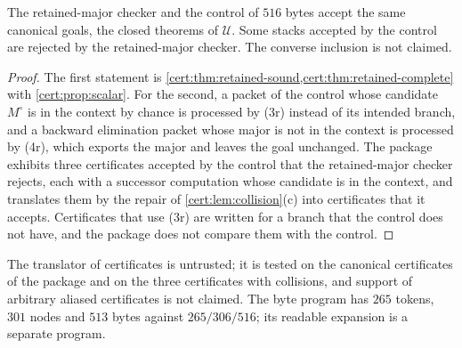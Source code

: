 \begin{proposition}\label{cert:prop:retained-change}
The retained-major checker and the control of $516$ bytes accept the same
canonical goals, the closed theorems of $\mathcal U$. Some stacks accepted by
the control are rejected by the retained-major checker. The converse inclusion
is not claimed.
\end{proposition}
\begin{proof}
The first statement is \cref{cert:thm:retained-sound,cert:thm:retained-complete}
with \cref{cert:prop:scalar}. For the second, a packet of the control whose
candidate $M^{\circ}$ is in the context by chance is processed by (3r) instead
of its intended branch, and a backward elimination packet whose major is not
in the context is processed by (4r), which exports the major and leaves the
goal unchanged. The package exhibits three certificates accepted by the
control that the retained-major checker rejects, each with a successor
computation whose candidate is in the context, and translates them by the
repair of \cref{cert:lem:collision}(c) into certificates that it accepts.
Certificates that use (3r) are written for a branch that the control does not
have, and the package does not compare them with the control.
\end{proof}

The translator of certificates is untrusted; it is tested on the canonical
certificates of the package and on the three certificates with collisions,
and support of arbitrary aliased certificates is not claimed. The byte program
has $265$ tokens, $301$ nodes and $513$ bytes against $265/306/516$; its
readable expansion is a separate program.

